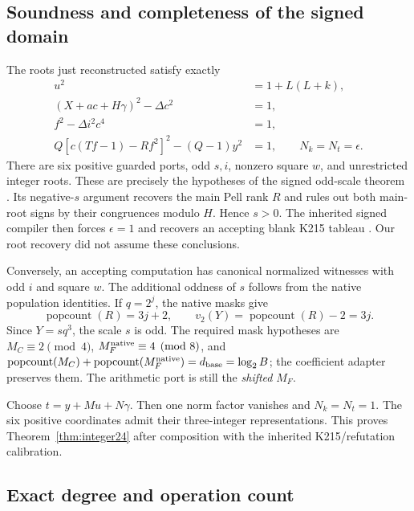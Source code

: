 \documentclass[11pt,letterpaper]{article}
\theoremstyle{remark}
\begin{document}
\subsection{Soundness and completeness of the signed domain}

The roots just reconstructed satisfy exactly
\begin{align*}
 u^2&=1+L(L+k),\\
 (X+ac+H\gamma)^2-\Delta c^2&=1,\\
 f^2-\Delta i^2c^4&=1,\\
 Q[c(Tf-1)-Rf^2]^2-(Q-1)y^2&=1,
 \qquad N_k=N_t=\epsilon.
\end{align*}
There are six positive guarded ports, odd $s,i$, nonzero square $w$,
and unrestricted integer roots. These are precisely the hypotheses of
the signed odd-scale theorem \cite{oddscale}. Its negative-$s$ argument
recovers the main Pell rank $R$ and rules out both main-root signs by
their congruences modulo $H$. Hence $s>0$. The inherited signed compiler
then forces $\epsilon=1$ and recovers an accepting blank K215 tableau
\cite{normalized}. Our root recovery did not assume these conclusions.

Conversely, an accepting computation has canonical normalized witnesses
with odd $i$ and square $w$. The additional oddness of $s$ follows from
the native population identities. If $q=2^j$, the native masks give
\[
 \operatorname{popcount}(R)=3j+2,
 \qquad v_2(Y)=\operatorname{popcount}(R)-2=3j.
\]
Since $Y=sq^3$, the scale $s$ is odd. The required mask hypotheses are
$M_C\equiv2\pmod4$, $M_F^{\rm native}\equiv4\pmod8$, and
$\operatorname{popcount}(M_C)+
\operatorname{popcount}(M_F^{\rm native})=d_{\rm base}=\log_2B$;
the coefficient adapter preserves them. The arithmetic port is still
the \emph{shifted} $M_F$.

Choose $t=y+Mu+N\gamma$. Then one norm factor vanishes and
$N_k=N_t=1$. The six positive coordinates admit their three-integer
representations. This proves Theorem~\ref{thm:integer24} after composition
with the inherited K215/refutation calibration.

\subsection{Exact degree and operation count}
\end{document}
